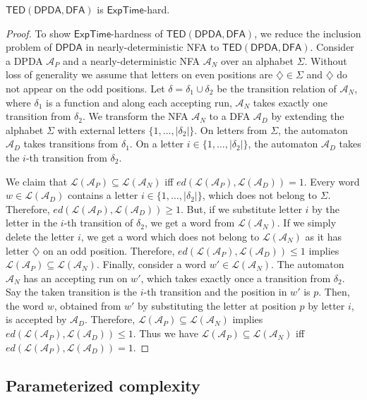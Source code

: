 \documentclass{CSML}
\newcommand{\aut}{\mathcal{A}}
\newcommand{\EXPTIME}{\textsf{ExpTime}}
\newcommand{\DFA}{\mathsf{DFA}}
\newcommand{\DPDA}{\mathsf{DPDA}}
\newcommand{\TED}{\mathsf{TED}}
\newcommand{\lang}{\mathcal{L}}
\newcommand{\ed}{ed}
\begin{document}
\begin{lem}
$\TED(\DPDA,\DFA)$ is $\EXPTIME$-hard.
\label{th:TEDexpHard}
\end{lem}
\begin{proof}
To show $\EXPTIME$-hardness of $\TED(\DPDA,\DFA)$, 
we reduce the inclusion problem of $\DPDA$ in nearly-deterministic NFA to $\TED(\DPDA,\DFA)$.
Consider a DPDA $\aut_P$ and a nearly-deterministic NFA $\aut_N$ over an alphabet $\Sigma$.
Without loss of generality we assume that letters on even positions are $\diamondsuit \in \Sigma$ and $\diamondsuit$
do not appear on the odd positions.
Let $\delta = \delta_1 \cup \delta_2$ be the transition relation of $\aut_N$, where $\delta_1$ is a function
and along each accepting run, $\aut_N$ takes exactly one transition from $\delta_2$.
We transform the NFA $\aut_N$ to a DFA $\aut_D$ by extending the alphabet $\Sigma$ with external letters $\{ 1, \ldots, |\delta_2| \}$.
On letters from $\Sigma$, the automaton $\aut_D$ takes transitions from $\delta_1$. 
On a letter $i \in \{ 1, \ldots, |\delta_2| \}$, the automaton $\aut_D$ takes the $i$-th transition from $\delta_2$.


We claim that $\lang(\aut_P) \subseteq \lang(\aut_N)$ iff 
$\ed(\lang(\aut_P), \lang(\aut_D)) = 1$.
Every word $w \in \lang(\aut_D)$ contains a letter $i \in \{ 1, \ldots, |\delta_2| \}$, which does not belong to $\Sigma$. 
Therefore, $\ed(\lang(\aut_P), \lang(\aut_D)) \geq 1$.
But, if we substitute letter $i$ by the letter in the $i$-th transition of $\delta_2$, we get a word from $\lang(\aut_N)$. 
If we simply delete the letter $i$, we get a word which does not belong to $\lang(\aut_N)$ as it has letter $\diamondsuit$ on an odd position.
Therefore, $\ed(\lang(\aut_P), \lang(\aut_D)) \leq 1$ implies 
$\lang(\aut_P) \subseteq \lang(\aut_N)$. 
Finally, consider a word $w' \in \lang(\aut_N)$. The automaton $\aut_N$ has an accepting run on $w'$, which takes exactly once a transition from $\delta_2$.
Say the taken transition is the $i$-th transition and the position in $w'$ is $p$.
Then, the word $w$, obtained from $w'$ by substituting the letter at position $p$ by letter $i$, is accepted by $\aut_D$.
Therefore, $\lang(\aut_P) \subseteq \lang(\aut_N)$ implies $\ed(\lang(\aut_P), \lang(\aut_D)) \leq 1$.
Thus we have $\lang(\aut_P) \subseteq \lang(\aut_N)$ iff $\ed(\lang(\aut_P), \lang(\aut_D)) = 1$.
\end{proof}



\subsection{Parameterized complexity}
\label{sec:parametricTED}
\end{document}
